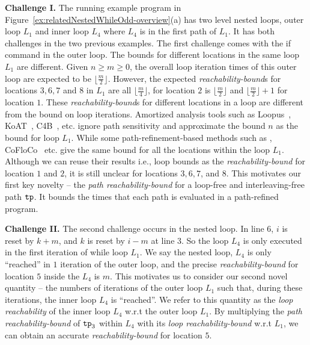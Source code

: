 

\textbf{Challenge I.}
The running example program in Figure~\ref{ex:relatedNestedWhileOdd-overview}(a) has two level nested loops, outer loop $L_1$ and inner loop $L_4$ where $L_4$ is in the first path of $L_1$.
It has both challenges in the two previous examples.
The first challenge comes with the if command in the outer loop.
The bounds for different locations in the same loop $L_1$ are different.
Given $n \geq m \geq 0$,
the overall loop iteration times of this outer loop are expected to be $\lfloor\frac{m}{2}\rfloor$.
However, the expected \emph{reachability-bound}s for locations $3, 6, 7$ and $8$ in $L_1$ are all $\lfloor\frac{m}{4}\rfloor$,
for location $2$ is $\lfloor\frac{m}{2}\rfloor$ and $\lfloor\frac{m}{2}\rfloor + 1$ for location $1$.
These \emph{reachability-bound}s for different locations in a loop are different from the bound on loop iterations.
Amortized analysis tools such as Loopus~\cite{SinnZV17}, KoAT~\cite{BrockschmidtEFFG14,FalkeKS12,FalkeKS11}, C4B~\cite{CarbonneauxHS15}, etc. ignore path sensitivity and approximate the bound $n$ as the bound for loop $L_1$. 
While some path-refinement-based methods such as \cite{GulwaniZ10,GulwaniJK09}, CoFloCo~\cite{Montoya17,Flores-Montoya16,Flores-MontoyaH14} etc. give the same bound for all the locations within the loop $L_1$. 
Although we can reuse their results i.e., loop bounds as the \emph{reachability-bound} for location $1$ and $2$,
it is still unclear for locations $3, 6, 7$, and $8$.
%
This motivates our first key novelty -- the \emph{path reachability-bound}
for a loop-free and interleaving-free path $\mathtt{tp}$.
It bounds the times that each path is evaluated in a path-refined program.


\textbf{Challenge II.} 
The second challenge occurs in the nested loop.
In line 6, $i$ is reset by $k + m$, and $k$ is reset by $i - m$ at line 3. So the
loop $L_4$ is only executed in the first iteration of while loop $L_1$.
We say the nested loop, $L_4$ is only ``reached'' in $1$ iteration of the outer loop,
and the precise \emph{reachability-bound} for location $5$ inside the $L_4$ is $m$.
This motivates us to consider our second novel quantity --
the numbers of iterations of the {outer loop $L_1$} such that,
during these iterations, the inner loop $L_4$ is ``reached''.
We refer to this quantity as the \emph{loop reachability} of the inner loop $L_4$ w.r.t the outer loop $L_1$.
By multiplying the \emph{path reachability-bound} of $\mathtt{tp}_3$ within $L_4$
with its \emph{loop reachability-bound} w.r.t $L_1$, we can obtain an accurate
\emph{reachability-bound} for location $5$.

